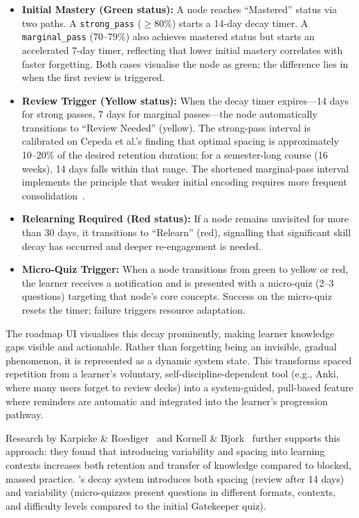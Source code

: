 \begin{itemize}
    \item \textbf{Initial Mastery (Green status):} A node reaches \enquote{Mastered} status via two paths. A \texttt{strong\_pass} (\(\ge 80\%\)) starts a 14-day decay timer. A \texttt{marginal\_pass} (70--79\%) also achieves mastered status but starts an accelerated 7-day timer, reflecting that lower initial mastery correlates with faster forgetting. Both cases visualise the node as green; the difference lies in when the first review is triggered.
    \item \textbf{Review Trigger (Yellow status):} When the decay timer expires---14 days for strong passes, 7 days for marginal passes---the node automatically transitions to \enquote{Review Needed} (yellow). The strong-pass interval is calibrated on Cepeda et al.'s finding that optimal spacing is approximately 10--20\% of the desired retention duration; for a semester-long course (16 weeks), 14 days falls within that range. The shortened marginal-pass interval implements the principle that weaker initial encoding requires more frequent consolidation~\cite{cepEDA2006}.
    \item \textbf{Relearning Required (Red status):} If a node remains unvisited for more than 30 days, it transitions to \enquote{Relearn} (red), signalling that significant skill decay has occurred and deeper re-engagement is needed.
    \item \textbf{Micro-Quiz Trigger:} When a node transitions from green to yellow or red, the learner receives a notification and is presented with a micro-quiz (2--3 questions) targeting that node's core concepts. Success on the micro-quiz resets the timer; failure triggers resource adaptation.
\end{itemize}

The roadmap UI visualises this decay prominently, making learner knowledge gaps visible and actionable. Rather than forgetting being an invisible, gradual phenomenon, it is represented as a dynamic system state. This transforms spaced repetition from a learner's voluntary, self-discipline-dependent tool (e.g., Anki, where many users forget to review decks) into a system-guided, pull-based feature where reminders are automatic and integrated into the learner's progression pathway.

Research by Karpicke \& Roediger~\cite{karpicke2008} and Kornell \& Bjork~\cite{kornell2008} further supports this approach: they found that introducing variability and spacing into learning contexts increases both retention and transfer of knowledge compared to blocked, massed practice. \projectname's decay system introduces both spacing (review after 14 days) and variability (micro-quizzes present questions in different formats, contexts, and difficulty levels compared to the initial Gatekeeper quiz).

